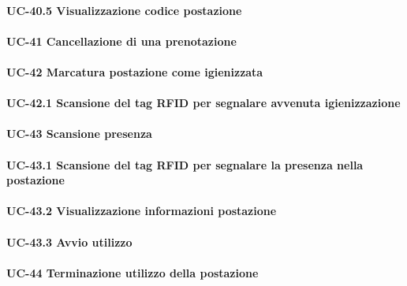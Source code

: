     \paragraph{UC-40.5 Visualizzazione codice postazione}

\paragraph{UC-41 Cancellazione di una prenotazione}

\paragraph{UC-42 Marcatura postazione come igienizzata}

    \paragraph{UC-42.1 Scansione del tag RFID per segnalare avvenuta igienizzazione}


\paragraph{UC-43 Scansione presenza}

    \paragraph{UC-43.1 Scansione del tag RFID per segnalare la presenza nella postazione}

    \paragraph{UC-43.2 Visualizzazione informazioni postazione}

    \paragraph{UC-43.3 Avvio utilizzo}

\paragraph{UC-44 Terminazione utilizzo della postazione}

